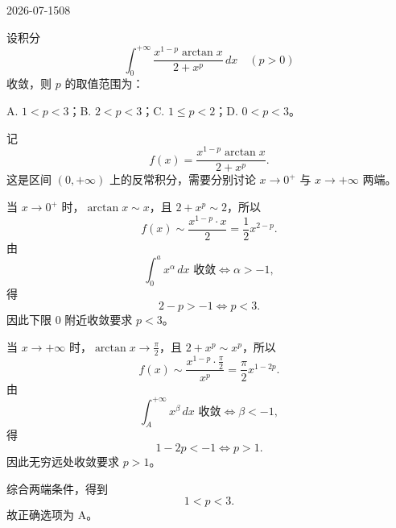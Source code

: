 \begin{mistake}{2026-07-15}{08}

\begin{problemcontent}
设积分
\[
\int_0^{+\infty}\frac{x^{1-p}\arctan x}{2+x^p}\,dx\quad (p>0)
\]
收敛，则 \(p\) 的取值范围为：

A. \(1<p<3\)；\quad B. \(2<p<3\)；\quad C. \(1\le p<2\)；\quad D. \(0<p<3\)。
\end{problemcontent}

\begin{solutioncontent}
记
\[
f(x)=\frac{x^{1-p}\arctan x}{2+x^p}.
\]
这是区间 \((0,+\infty)\) 上的反常积分，需要分别讨论 \(x\to 0^+\) 与 \(x\to +\infty\) 两端。

当 \(x\to 0^+\) 时，\(\arctan x\sim x\)，且 \(2+x^p\sim 2\)，所以
\[
f(x)\sim \frac{x^{1-p}\cdot x}{2}=\frac12 x^{2-p}.
\]
由
\[
\int_0^a x^\alpha\,dx \text{ 收敛}\iff \alpha>-1,
\]
得
\[
2-p>-1 \iff p<3.
\]
因此下限 \(0\) 附近收敛要求 \(p<3\)。

当 \(x\to +\infty\) 时，\(\arctan x\to \frac\pi2\)，且 \(2+x^p\sim x^p\)，所以
\[
f(x)\sim \frac{x^{1-p}\cdot \frac\pi2}{x^p}=\frac\pi2 x^{1-2p}.
\]
由
\[
\int_A^{+\infty}x^\beta\,dx \text{ 收敛}\iff \beta<-1,
\]
得
\[
1-2p<-1 \iff p>1.
\]
因此无穷远处收敛要求 \(p>1\)。

综合两端条件，得到
\[
1<p<3.
\]
故正确选项为 A。
\end{solutioncontent}


\end{mistake}
